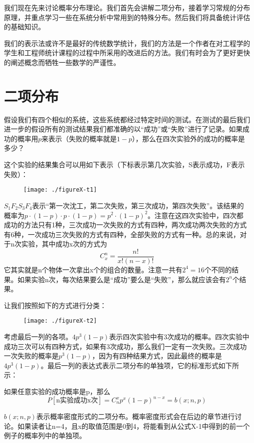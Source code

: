 \documentclass[cn,11pt,chinese]{elegantbook}
\begin{document}
{我们现在先来讨论概率分布理论。我们首先会讲解二项分布，接着学习常规的分布原理，并重点学习一些在系统分析中常用到的特殊分布。然后我们将具备统计评估的基础知识。

我们的表示法或许不是最好的传统数学统计，我们的方法是一个作者在对工程学的学生和工程师统计课程的过程中所采用的改进后的方法。我们有时会为了更好更快的阐述概念而牺牲一些数学的严谨性。

\section{二项分布}

假设我们有四个相似的系统，这些系统都经过特定时间的测试。在测试的最后我们进一步的假设所有的测试结果我们都准确的以“成功”或“失败”进行了记录。如果成功的概率用$p$来表示（失败的概率就是$1-p$），那么在四次实验外的成功的概率是多少？

这个实验的结果集合可以用如下表示（下标表示第几次实验，S表示成功，F表示失败）：

\begin{figure}[H]
	\texttt{[image: ./figureX-t1]}
\end{figure}

$S_1F_2S_3F_4$表示“第一次沈工，第二次失败，第三次成功，第四次失败”。该结果的概率为$p\cdot(1-p)\cdot p \cdot (1-p)=p^2\cdot (1-p)^2$。注意在这四次实验中，四次都成功的方法只有1种，三次成功一次失败的方式有四种，两次成功两次失败的方式有6种，一次成功三次失败的方式有四种，全部失败的方式有一种。总的来说，对于n次实验，其中成功x次的方式为
$$
C_x^n=\frac{n!}{x!(n-x)!}$$
它其实就是n个物体一次拿出x个的组合的数量。注意一共有$2^4=16$个不同的结果。如果实验n次，每次结果要么是“成功”要么是“失败”，那么就应该会有$2^n$个结果。

让我们按照如下的方式进行分类：

\begin{figure}[H]
	\texttt{[image: ./figureX-t2]}
\end{figure}

考虑最后一列的各项。$4p^3(1-p)$表示四次实验中有3次成功的概率。四次实验中成功三次可以有四种方式，如果有3次成功，那么我们一定有一次失败。三次成功一次失败的概率是$p^3(1-p)$，因为有四种结果方式，因此最终的概率是$4p^3(1-p)$。最后一列的表达式表示二项分布的单独项，它的标准形式如下所示：

如果任意实验的成功概率是p，那么
\begin{equation}\label{eq10-1}
P[\mbox{n实验成功x次}]=C^x_n p^x(1-p)^{n-x}=b(x;n,p) 
\end{equation}


$b(x;n,p)$表示概率密度形式的二项分布。概率密度形式会在后边的章节进行讨论。如果读者让n=4，且x的取值范围是0到4，将能看到从公式X-1中得到的前一个例子的概率列中的单独项。

}
\end{document}
